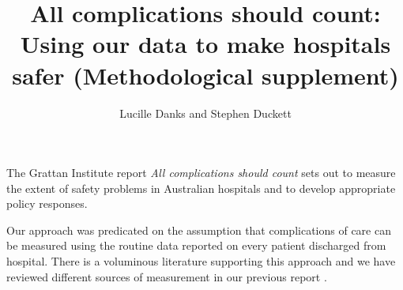\documentclass[submission]{grattan}
\title{All complications should count: Using our data to make hospitals safer (Methodological supplement)}
\author{Lucille Danks and Stephen Duckett}
\newcommand*{\myTitle}{All complications should count}
\begin{document}
\setlength{\textfloatsep}{1.6\baselineskip}
\contentspage
\listoffigures









The Grattan Institute report \textit{\myTitle} sets out to measure the extent of safety problems in Australian hospitals and to develop appropriate policy responses.

Our approach was predicated on the assumption that complications of care can be measured using the routine data reported on every patient discharged from hospital.
There is a voluminous literature supporting this approach and we have reviewed different sources of measurement in our previous report .
\end{document}
